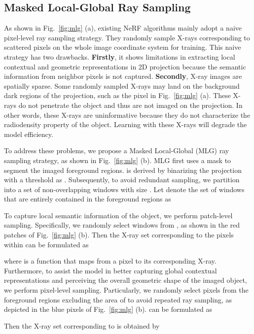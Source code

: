 \documentclass[10pt,twocolumn,letterpaper]{article}
\begin{document}
\subsection{Masked Local-Global Ray Sampling}
As shown in Fig.~\ref{fig:mlg} (a), existing NeRF algorithms mainly adopt a naive pixel-level ray sampling strategy. They randomly sample X-rays corresponding to scattered pixels on the whole image coordinate system for training. This naive strategy has two drawbacks. \textbf{Firstly}, it shows limitations in extracting local contextual and geometric representations in 2D projection because the semantic information from neighbor pixels is not captured. \textbf{Secondly}, X-ray images are spatially sparse. Some randomly sampled X-rays may land on the background dark regions of the projection, such as the pixel  in Fig.~\ref{fig:mlg} (a). These X-rays do not penetrate the object and thus are not imaged on the projection. In other words, these X-rays are uninformative because they do not characterize the radiodensity property of the object. Learning with these X-rays will degrade the model efficiency.

To address these problems, we propose a Masked Local-Global (MLG) ray sampling strategy, as shown in Fig.~\ref{fig:mlg} (b). MLG first uses a mask  to segment the imaged foreground regions.  is derived by binarizing the projection  with a threshold  as . Subsequently, to avoid redundant sampling, we partition  into a set  of  non-overlapping windows with size . Let  denote the set of windows that are entirely contained in the foreground regions as

To capture local semantic information of the object, we perform patch-level sampling. Specifically, we randomly select  windows  from , as shown in the red patches of Fig.~\ref{fig:mlg} (b). Then the X-ray set  corresponding to the pixels within  can be formulated as
\vspace{-1mm}

where  is a function that maps from a pixel  to its corresponding X-ray. Furthermore, to assist the model in better capturing global contextual representations and perceiving the overall geometric shape of the imaged object, we perform pixel-level sampling. Particularly, we randomly select  pixels  from the foreground regions excluding the area of  to avoid repeated ray sampling, as depicted in the blue pixels of Fig.~\ref{fig:mlg} (b).  can be formulated as
\vspace{-0.0mm}

Then the X-ray set  corresponding to   is obtained by
\vspace{-1mm}
\end{document}
